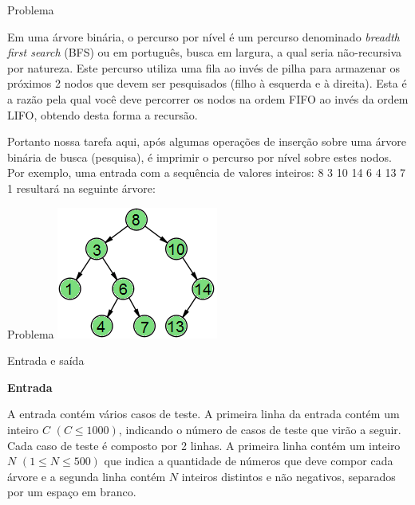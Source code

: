 
\begin{frame}[fragile]{Problema}

Em uma árvore binária, o percurso por nível é um percurso denominado \textit{breadth first search} (BFS) ou em português, busca em largura, a qual seria não-recursiva por natureza. Este percurso utiliza uma fila ao invés de pilha para armazenar os próximos 2 nodos que devem ser pesquisados (filho à esquerda e à direita). Esta é a razão pela qual você deve percorrer os nodos na ordem FIFO ao invés da ordem LIFO, obtendo desta forma a recursão.

Portanto nossa tarefa aqui, após algumas operações de inserção sobre uma árvore binária de busca (pesquisa), é imprimir o percurso por nível sobre estes nodos. Por exemplo, uma entrada com a sequência de valores inteiros: 8 3 10 14 6 4 13 7 1 resultará na seguinte árvore:

\end{frame}


\begin{frame}[fragile]{Problema}
    \includegraphics[scale=1,center]{figures/UOJ_1466.png}
\end{frame}

\begin{frame}[fragile]{Entrada e saída}

\textbf{Entrada}

A entrada contém vários casos de teste. A primeira linha da entrada contém um inteiro $C$ $(C \leq 1000)$, indicando o número de casos de teste que virão a seguir. Cada caso de teste é composto por 2 linhas. A primeira linha contém um inteiro $N$ $(1 \leq N \leq 500)$ que indica a quantidade de números que deve compor cada árvore e a segunda linha contém $N$ inteiros distintos e não negativos, separados por um espaço em branco.

\end{frame}

